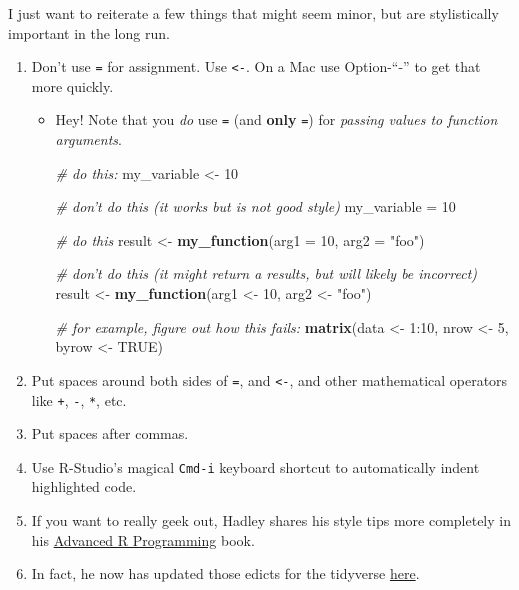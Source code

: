 \documentclass[]{book}
\newenvironment{Shaded}{\begin{snugshade}}{\end{snugshade}}
\newcommand{\KeywordTok}[1]{\textcolor[rgb]{0.13,0.29,0.53}{\textbf{{#1}}}}
\newcommand{\DataTypeTok}[1]{\textcolor[rgb]{0.13,0.29,0.53}{{#1}}}
\newcommand{\DecValTok}[1]{\textcolor[rgb]{0.00,0.00,0.81}{{#1}}}
\newcommand{\StringTok}[1]{\textcolor[rgb]{0.31,0.60,0.02}{{#1}}}
\newcommand{\CommentTok}[1]{\textcolor[rgb]{0.56,0.35,0.01}{\textit{{#1}}}}
\newcommand{\OtherTok}[1]{\textcolor[rgb]{0.56,0.35,0.01}{{#1}}}
\newcommand{\NormalTok}[1]{{#1}}
\providecommand{\tightlist}{%
  \setlength{\itemsep}{0pt}\setlength{\parskip}{0pt}}
\theoremstyle{definition}
\theoremstyle{definition}
\theoremstyle{remark}
\begin{document}
I just want to reiterate a few things that might seem minor, but are
stylistically important in the long run.

\begin{enumerate}
\def\labelenumi{\arabic{enumi}.}
\tightlist
\item
  Don't use \texttt{=} for assignment. Use \texttt{\textless{}-}. On a
  Mac use Option-``-'' to get that more quickly.

  \begin{itemize}
  \item
    Hey! Note that you \emph{do} use \texttt{=} (and \textbf{only}
    \texttt{=}) for \emph{passing values to function arguments}.

\begin{Shaded}
\begin{Highlighting}[]
\CommentTok{# do this:}
\NormalTok{my_variable <-}\StringTok{ }\DecValTok{10}

\CommentTok{# don't do this (it works but is not good style)}
\NormalTok{my_variable =}\StringTok{ }\DecValTok{10}


\CommentTok{# do this}
\NormalTok{result <-}\StringTok{ }\KeywordTok{my_function}\NormalTok{(}\DataTypeTok{arg1 =} \DecValTok{10}\NormalTok{, }\DataTypeTok{arg2 =} \StringTok{"foo"}\NormalTok{)}

\CommentTok{# don't do this (it might return a results, but will likely be incorrect)}
\NormalTok{result <-}\StringTok{ }\KeywordTok{my_function}\NormalTok{(arg1 <-}\StringTok{ }\DecValTok{10}\NormalTok{, arg2 <-}\StringTok{ "foo"}\NormalTok{)}

\CommentTok{# for example, figure out how this fails:}
\KeywordTok{matrix}\NormalTok{(data <-}\StringTok{ }\DecValTok{1}\NormalTok{:}\DecValTok{10}\NormalTok{, nrow <-}\StringTok{ }\DecValTok{5}\NormalTok{, byrow <-}\StringTok{ }\OtherTok{TRUE}\NormalTok{)}
\end{Highlighting}
\end{Shaded}
  \end{itemize}
\item
  Put spaces around both sides of \texttt{=}, and \texttt{\textless{}-},
  and other mathematical operators like \texttt{+}, \texttt{-},
  \texttt{*}, etc.
\item
  Put spaces after commas.
\item
  Use R-Studio's magical \texttt{Cmd-i} keyboard shortcut to
  automatically indent highlighted code.
\item
  If you want to really geek out, Hadley shares his style tips more
  completely in his \href{http://adv-r.had.co.nz/Style.html}{Advanced R
  Programming} book.
\item
  In fact, he now has updated those edicts for the tidyverse
  \href{http://style.tidyverse.org/index.html}{here}.
\end{enumerate}
\end{document}
